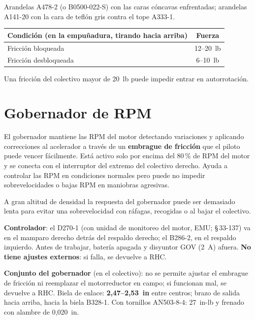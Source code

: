 Arandelas A478-2 (o B0500-022-S) con las caras cóncavas enfrentadas; arandelas A141-20 con la cara de teflón gris contra el tope A333-1.

\begin{center}
\begin{tabular}{@{}lc@{}}
\toprule
Condición (en la empuñadura, tirando hacia arriba) & Fuerza \\
\midrule
Fricción bloqueada & 12--20~lb \\
Fricción desbloqueada & 6--10~lb \\
\bottomrule
\end{tabular}
\end{center}

\begin{advertencia}
Una fricción del colectivo mayor de 20~lb puede impedir entrar en autorrotación.
\end{advertencia}

\section{Gobernador de RPM}

El gobernador mantiene las RPM del motor detectando variaciones y aplicando correcciones al acelerador a través de un \textbf{embrague de fricción} que el piloto puede vencer fácilmente. Está activo solo por encima del 80\,\% de RPM del motor y se conecta con el interruptor del extremo del colectivo derecho. Ayuda a controlar las RPM en condiciones normales pero puede no impedir sobrevelocidades o bajas RPM en maniobras agresivas.

\begin{precaucion}
A gran altitud de densidad la respuesta del gobernador puede ser demasiado lenta para evitar una sobrevelocidad con ráfagas, recogidas o al bajar el colectivo.
\end{precaucion}

\textbf{Controlador}: el D270-1 (con unidad de monitoreo del motor, EMU; \S\,33-137) va en el mamparo derecho detrás del respaldo derecho; el B286-2, en el respaldo izquierdo. Antes de trabajar, batería apagada y disyuntor GOV (2~A) afuera. \textbf{No tiene ajustes externos}: si falla, se devuelve a RHC.

\textbf{Conjunto del gobernador} (en el colectivo): no se permite ajustar el embrague de fricción ni reemplazar el motorreductor en campo; si funcionan mal, se devuelve a RHC. Biela de enlace: \textbf{2,47--2,53~in} entre centros; brazo de salida hacia arriba, hacia la biela B328-1. Con tornillos AN503-8-4: 27~in-lb y frenado con alambre de 0,020~in.

